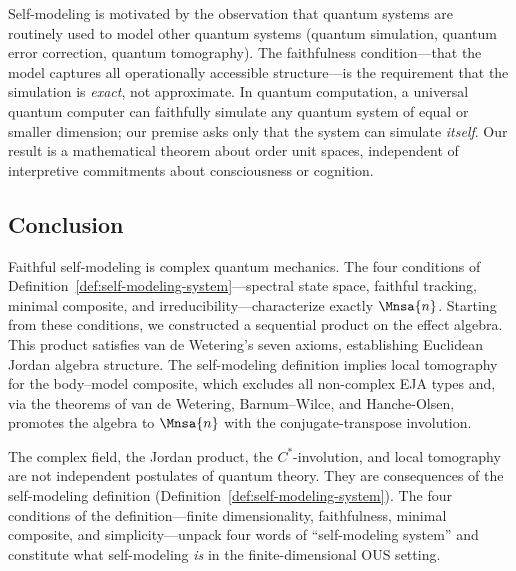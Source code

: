 \begin{remark}
\label{rem:motivation-objection}
Self-modeling is motivated by the observation that quantum systems are
routinely used to model other quantum systems (quantum simulation, quantum
error correction, quantum tomography).  The faithfulness condition---that
the model captures all operationally accessible structure---is the
requirement that the simulation is \emph{exact}, not approximate.  In
quantum computation, a universal quantum computer can faithfully
simulate any quantum system of equal or smaller dimension; our premise
asks only that the system can simulate \emph{itself}.  Our result
is a mathematical theorem about order unit spaces, independent of
interpretive commitments about consciousness or cognition.
\end{remark}


\subsection{Conclusion}\label{subsec:conclusion}

Faithful self-modeling is complex quantum mechanics.  The four
conditions of Definition~\ref{def:self-modeling-system}---spectral
state space, faithful tracking, minimal composite, and
irreducibility---characterize exactly $\Mnsa{n}$.  Starting from
these conditions, we constructed a sequential product on the effect
algebra.  This product satisfies van de Wetering's seven axioms,
establishing Euclidean Jordan algebra structure.  The self-modeling
definition implies local tomography for the body--model composite,
which excludes all non-complex EJA types and, via the theorems of
van de Wetering, Barnum--Wilce, and Hanche-Olsen, promotes the algebra
to $\Mnsa{n}$ with the conjugate-transpose involution.

The complex field, the Jordan product, the $C^{*}$-involution, and
local tomography are not independent postulates of quantum theory.
They are consequences of the self-modeling definition
(Definition~\ref{def:self-modeling-system}).  The four conditions of
the definition---finite dimensionality, faithfulness, minimal
composite, and simplicity---unpack four words of ``self-modeling system'' and constitute what
self-modeling \emph{is} in the finite-dimensional OUS setting.

